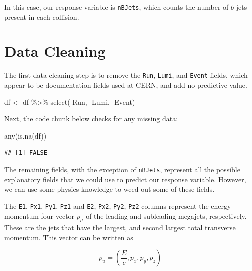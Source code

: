 \documentclass[
]{article}
\newenvironment{Shaded}{\begin{snugshade}}{\end{snugshade}}
\newcommand{\FunctionTok}[1]{\textcolor[rgb]{0.00,0.00,0.00}{#1}}
\newcommand{\NormalTok}[1]{#1}
\newcommand{\OtherTok}[1]{\textcolor[rgb]{0.56,0.35,0.01}{#1}}
\newcommand{\SpecialCharTok}[1]{\textcolor[rgb]{0.00,0.00,0.00}{#1}}
\begin{document}
In this case, our response variable is \texttt{nBJets}, which counts the
number of \(b\)-jets present in each collision.

\hypertarget{data-cleaning}{%
\section{Data Cleaning}\label{data-cleaning}}

The first data cleaning step is to remove the \texttt{Run},
\texttt{Lumi}, and \texttt{Event} fields, which appear to be
documentation fields used at CERN, and add no predictive value.

\begin{Shaded}
\begin{Highlighting}[]
\NormalTok{df }\OtherTok{\textless{}{-}}\NormalTok{ df }\SpecialCharTok{\%\textgreater{}\%}
  \FunctionTok{select}\NormalTok{(}\SpecialCharTok{{-}}\NormalTok{Run, }\SpecialCharTok{{-}}\NormalTok{Lumi, }\SpecialCharTok{{-}}\NormalTok{Event)}
\end{Highlighting}
\end{Shaded}

Next, the code chunk below checks for any missing data:

\begin{Shaded}
\begin{Highlighting}[]
\FunctionTok{any}\NormalTok{(}\FunctionTok{is.na}\NormalTok{(df))}
\end{Highlighting}
\end{Shaded}

\begin{verbatim}
## [1] FALSE
\end{verbatim}

The remaining fields, with the exception of \texttt{nBJets}, represent
all the possible explanatory fields that we could use to predict our
response variable. However, we can use some physics knowledge to weed
out some of these fields.

The \texttt{E1}, \texttt{Px1}, \texttt{Py1}, \texttt{Pz1} and
\texttt{E2}, \texttt{Px2}, \texttt{Py2}, \texttt{Pz2} columns represent
the energy-momentum four vector \(p_{\mu}\) of the leading and
subleading megajets, respectively. These are the jets that have the
largest, and second largest total transverse momentum. This vector can
be written as

\[
\begin{equation}
p_u = (\frac{E}{c}, p_x, p_y, p_z)
\end{equation}
\]
\end{document}
